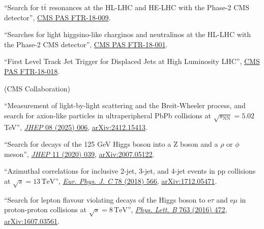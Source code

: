 \begin{description}[leftmargin=12pt,font=\normalfont\textit]
\begin{nbdescription}[leftmargin=12pt,font=\normalfont,labelsep=0em]
\item ``Search for $\text{t}\bar{\text{t}}$ resonances at the HL-LHC and HE-LHC with the Phase-2 CMS detector'', \href{https://cds.cern.ch/record/2649032}{CMS PAS FTR-18-009}.
\item ``Searches for light higgsino-like charginos and neutralinos at the HL-LHC with the Phase-2 CMS detector'', \href{https://cds.cern.ch/record/2648538}{CMS PAS FTR-18-001}.
\item ``First Level Track Jet Trigger for Displaced Jets at High Luminosity LHC'', \href{https://cds.cern.ch/record/2647987}{CMS PAS FTR-18-018}.
\end{nbdescription}
\item[FNAL institutional review leader:] (CMS Collaboration)
\begin{nbdescription}[leftmargin=12pt,font=\normalfont,labelsep=0em]
\item ``Measurement of light-by-light scattering and the Breit-Wheeler process, and search for axion-like particles in ultraperipheral PbPb collisions at $\sqrt{s_{\text{NN}}} = 5.02$ TeV'', \href{https://doi.org/10.1007/JHEP08(2025)006}{\emph{JHEP} 08 (2025) 006}, \href{https://arxiv.org/abs/2412.15413}{arXiv:2412.15413}.
\item ``Search for decays of the 125 GeV Higgs boson into a Z boson and a $\rho$ or $\phi$ meson'', \href{https://doi.org/10.1007/JHEP11(2020)039}{\emph{JHEP} 11 (2020) 039}, \href{https://arxiv.org/abs/2007.05122}{arXiv:2007.05122}.
\item {} ``Azimuthal correlations for inclusive 2-jet, 3-jet, and 4-jet events in pp collisions at $\sqrt{s} = 13\,\text{TeV}$'', \href{http://dx.doi.org/10.1140/epjc/s10052-018-6033-4}{\emph{Eur. Phys. J. C} 78 (2018) 566}, \href{http://arxiv.org/abs/1712.05471}{arXiv:1712.05471}.
\item ``Search for lepton flavour violating decays of the Higgs boson to e$\tau$ and e$\mu$ in proton-proton collisions at $\sqrt{s} = 8\,\text{TeV}$'', \href{http://dx.doi.org/10.1016/j.physletb.2016.09.062}{\emph{Phys. Lett. B} 763 (2016) 472}, \href{http://arxiv.org/abs/1607.03561}{arXiv:1607.03561}.
\end{nbdescription}
\end{description}